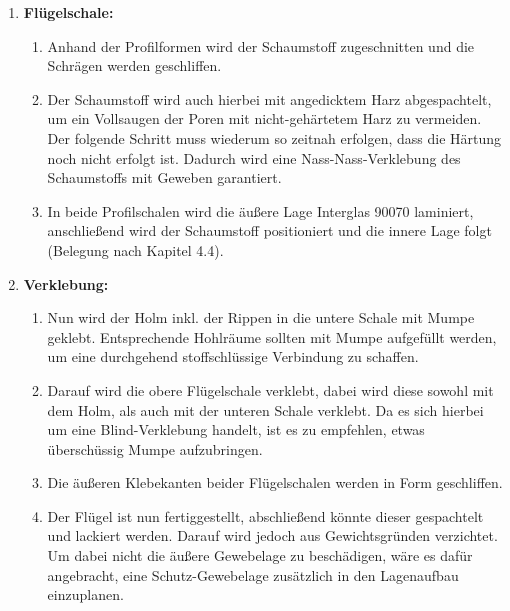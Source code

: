 \begin{enumerate}
\begin{enumerate}
	\end{enumerate}
	\item \textbf{Flügelschale:}
	\begin{enumerate}
		\item Anhand der Profilformen wird der Schaumstoff zugeschnitten und die Schrägen werden geschliffen.
		\item Der Schaumstoff wird auch hierbei mit angedicktem Harz \glqq abgespachtelt\grqq, um ein Vollsaugen der Poren mit nicht-gehärtetem Harz zu vermeiden. Der folgende Schritt muss wiederum so zeitnah erfolgen, dass die Härtung noch nicht erfolgt ist. Dadurch wird eine Nass-Nass-Verklebung des Schaumstoffs mit Geweben garantiert.
		\item In beide Profilschalen wird die äußere Lage Interglas 90070 laminiert, anschließend wird der Schaumstoff positioniert und die innere Lage folgt (Belegung nach Kapitel 4.4).
	\end{enumerate}
	\item \textbf{Verklebung:}
	\begin{enumerate}
		\item Nun wird der Holm inkl. der Rippen in die untere Schale mit Mumpe geklebt. Entsprechende Hohlräume sollten mit Mumpe aufgefüllt werden, um eine durchgehend stoffschlüssige Verbindung zu schaffen.
		\item Darauf wird die obere Flügelschale verklebt, dabei wird diese sowohl mit dem Holm, als auch mit der unteren Schale verklebt. Da es sich hierbei um eine Blind-Verklebung handelt, ist es zu empfehlen, etwas überschüssig Mumpe aufzubringen.
		\item Die äußeren Klebekanten beider Flügelschalen werden in Form geschliffen.
		\item Der Flügel ist nun fertiggestellt, abschließend könnte dieser gespachtelt und lackiert werden. Darauf wird jedoch aus Gewichtsgründen verzichtet. Um dabei nicht die äußere Gewebelage zu beschädigen, wäre es dafür angebracht, eine Schutz-Gewebelage zusätzlich in den Lagenaufbau einzuplanen.
	\end{enumerate}
\end{enumerate}

